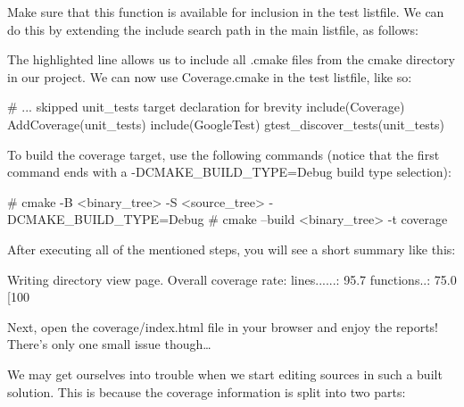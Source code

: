 
Make sure that this function is available for inclusion in the test listfile. We can do this by extending the include search path in the main listfile, as follows:



The highlighted line allows us to include all .cmake files from the cmake directory in our project. We can now use Coverage.cmake in the test listfile, like so:


\begin{cmake}
# ... skipped unit_tests target declaration for brevity
include(Coverage)
AddCoverage(unit_tests)
include(GoogleTest)
gtest_discover_tests(unit_tests)
\end{cmake}

To build the coverage target, use the following commands (notice that the first command ends with a -DCMAKE\_BUILD\_TYPE=Debug build type selection):

\begin{shell}
# cmake -B <binary_tree> -S <source_tree> -DCMAKE_BUILD_TYPE=Debug
# cmake --build <binary_tree> -t coverage
\end{shell}

After executing all of the mentioned steps, you will see a short summary like this:

\begin{shell}
Writing directory view page.
Overall coverage rate:
  lines......: 95.7%
  functions..: 75.0%
[100%
\end{shell}

Next, open the coverage/index.html file in your browser and enjoy the reports! There’s only one small issue though…


We may get ourselves into trouble when we start editing sources in such a built solution. This is because the coverage information is split into two parts:

